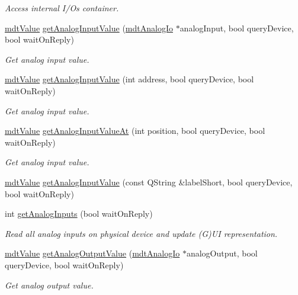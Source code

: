 \begin{DoxyCompactItemize}
\begin{DoxyCompactList}\small\item\em Access internal I/\-Os container. \end{DoxyCompactList}\item 
\hyperlink{classmdt_value}{mdt\-Value} \hyperlink{classmdt_multi_io_device_ac39f01b071d5b7c16e18db298160134d}{get\-Analog\-Input\-Value} (\hyperlink{classmdt_analog_io}{mdt\-Analog\-Io} $\ast$analog\-Input, bool query\-Device, bool wait\-On\-Reply)
\begin{DoxyCompactList}\small\item\em Get analog input value. \end{DoxyCompactList}\item 
\hyperlink{classmdt_value}{mdt\-Value} \hyperlink{classmdt_multi_io_device_a000b911a7fa7fa1d56c8413625f700ff}{get\-Analog\-Input\-Value} (int address, bool query\-Device, bool wait\-On\-Reply)
\begin{DoxyCompactList}\small\item\em Get analog input value. \end{DoxyCompactList}\item 
\hyperlink{classmdt_value}{mdt\-Value} \hyperlink{classmdt_multi_io_device_a41c8a0d52c94cb30b394e3da41ebfff5}{get\-Analog\-Input\-Value\-At} (int position, bool query\-Device, bool wait\-On\-Reply)
\begin{DoxyCompactList}\small\item\em Get analog input value. \end{DoxyCompactList}\item 
\hyperlink{classmdt_value}{mdt\-Value} \hyperlink{classmdt_multi_io_device_a7851ab0b09ee2d30846fc76b7bce165a}{get\-Analog\-Input\-Value} (const Q\-String \&label\-Short, bool query\-Device, bool wait\-On\-Reply)
\item 
int \hyperlink{classmdt_multi_io_device_a73bbcd721b309930174d5e91266d0298}{get\-Analog\-Inputs} (bool wait\-On\-Reply)
\begin{DoxyCompactList}\small\item\em Read all analog inputs on physical device and update (G)U\-I representation. \end{DoxyCompactList}\item 
\hyperlink{classmdt_value}{mdt\-Value} \hyperlink{classmdt_multi_io_device_ae4d5260c3fcf9c6cd10114cc411dafe0}{get\-Analog\-Output\-Value} (\hyperlink{classmdt_analog_io}{mdt\-Analog\-Io} $\ast$analog\-Output, bool query\-Device, bool wait\-On\-Reply)
\begin{DoxyCompactList}\small\item\em Get analog output value. \end{DoxyCompactList}\item 

\end{DoxyCompactItemize}
